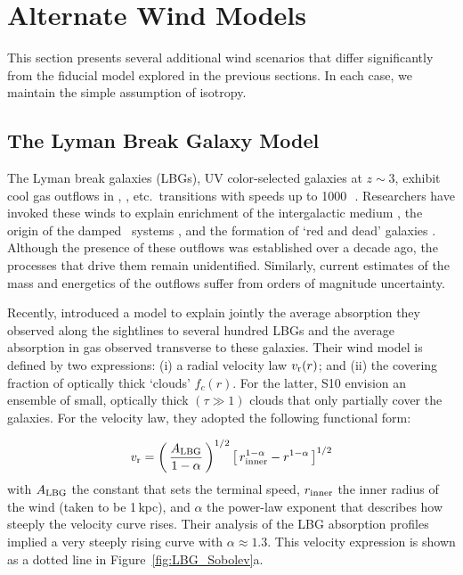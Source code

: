 \documentclass[]{emulateapj}
\begin{document}
\section{Alternate Wind Models}
\label{sec:alternate}

This section presents several additional wind scenarios that differ
significantly from the fiducial model explored in the previous
sections.  In each case, we maintain the simple assumption of
isotropy.

\subsection{The Lyman Break Galaxy Model}
\label{sec:lbg}

The Lyman break galaxies (LBGs), UV color-selected galaxies at $z \sim 3$,
exhibit cool gas outflows in , ,
etc.\ transitions with speeds up to 1000\,\kms\
\citep[e.g.][]{lkg+97,pks+98}.
Researchers have invoked these winds to explain enrichment of
the intergalactic medium \citep[e.g.][]{ahs+01,spa+06}, the origin of the
damped \lya\ systems \citep{nbf98,schaye01a}, and the formation of
`red and dead' galaxies \citep[e.g.][]{spf01}.  Although the
presence of these outflows was established over a decade ago,
the processes that drive them remain
unidentified.  Similarly,  current estimates of the mass and energetics of the
outflows suffer from orders of magnitude uncertainty.

Recently, \citet[][hereafter S10]{steidel+10} introduced a model to
explain jointly the average absorption they observed
along the sightlines to several hundred LBGs and the average absorption in gas
observed transverse to these galaxies.  
Their wind model is defined by two
expressions: (i) a radial velocity law $v_{\rm r}(r)$; and (ii) the covering
fraction of optically thick `clouds' $f_c(r)$.  For the latter, S10
envision an 
ensemble of small, optically thick $(\tau \gg 1)$ clouds that only
partially cover the galaxies.
For the velocity law, they adopted the following functional
form:

\begin{equation}
v_{\rm r} = \left ( \, \frac{A_{\rm LBG}}{1-\alpha} \, \right )^{1/2} \left [ \, r_{\rm
  inner}^{1-\alpha} - r^{1-\alpha} \, \right ]^{1/2}
\label{eqn:LBG_vlaw}
\end{equation}
with $A_{\rm LBG}$ the constant that sets the terminal speed,
$r_{\rm inner}$ the inner radius of the wind (taken to be 1\,kpc), and
$\alpha$ the power-law exponent that describes how steeply the velocity curve rises.  Their
analysis of the LBG absorption profiles implied
a very steeply rising curve with $\alpha \approx 1.3$.
This velocity expression is shown as a dotted line in 
Figure~\ref{fig:LBG_Sobolev}a.  
\end{document}

